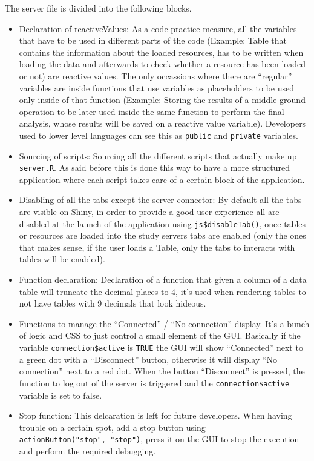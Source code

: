 \documentclass[
]{book}
\providecommand{\tightlist}{%
  \setlength{\itemsep}{0pt}\setlength{\parskip}{0pt}}
\begin{document}
The server file is divided into the following blocks.

\begin{itemize}
\tightlist
\item
  Declaration of reactiveValues: As a code practice measure, all the variables that have to be used in different parts of the code (Example: Table that contains the information about the loaded resources, has to be written when loading the data and afterwards to check whether a resource has been loaded or not) are reactive values. The only occassions where there are ``regular'' variables are inside functions that use variables as placeholders to be used only inside of that function (Example: Storing the results of a middle ground operation to be later used inside the same function to perform the final analysis, whose results will be saved on a reactive value variable). Developers used to lower level languages can see this as \texttt{public} and \texttt{private} variables.
\item
  Sourcing of scripts: Sourcing all the different scripts that actually make up \texttt{server.R}. As said before this is done this way to have a more structured application where each script takes care of a certain block of the application.
\item
  Disabling of all the tabs except the server connector: By default all the tabs are visible on Shiny, in order to provide a good user experience all are disabled at the launch of the application using \texttt{js\$disableTab()}, once tables or resources are loaded into the study servers tabs are enabled (only the ones that makes sense, if the user loads a Table, only the tabs to interacts with tables will be enabled).
\item
  Function declaration: Declaration of a function that given a column of a data table will truncate the decimal places to 4, it's used when rendering tables to not have tables with 9 decimals that look hideous.
\item
  Functions to manage the ``Connected'' / ``No connection'' display. It's a bunch of logic and CSS to just control a small element of the GUI. Basically if the variable \texttt{connection\$active} is \texttt{TRUE} the GUI will show ``Connected'' next to a green dot with a ``Disconnect'' button, otherwise it will display ``No connection'' next to a red dot. When the button ``Disconnect'' is pressed, the function to log out of the server is triggered and the \texttt{connection\$active} variable is set to false.
\item
  Stop function: This delcaration is left for future developers. When having trouble on a certain spot, add a stop button using \texttt{actionButton("stop",\ "stop")}, press it on the GUI to stop the execution and perform the required debugging.
\end{itemize}
\end{document}
